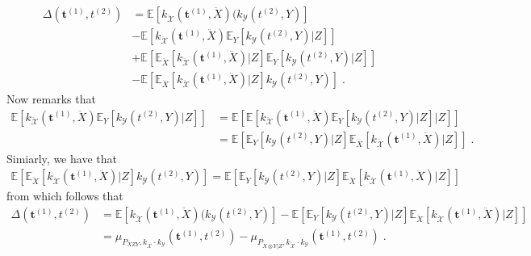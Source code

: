 \begin{align*}
    \Delta(\mathbf{t}^{(1)},t^{(2)}) &=\mathbb{E}\left[k_{\mathcal{\ddot{X}}}(\mathbf{t}^{(1)},\ddot{X})(k_{\mathcal{Y}}(t^{(2)},Y)\right]\\ 
    &- \mathbb{E}\left[k_{\mathcal{\ddot{X}}}(\mathbf{t}^{(1)},\ddot{X})\mathbb{E}_{Y}\left[k_{\mathcal{Y}}(t^{(2)},Y)|Z\right]\right]\\
    &+ \mathbb{E}\left[\mathbb{E}_{\ddot{X}}\left[k_{\mathcal{\ddot{X}}}(\mathbf{t}^{(1)},\ddot{X})|Z\right] \mathbb{E}_{Y}\left[k_{\mathcal{Y}}(t^{(2)},Y)|Z\right] \right]\\
   &- \mathbb{E}\left[\mathbb{E}_{\ddot{X}}\left[k_{\mathcal{\ddot{X}}}(\mathbf{t}^{(1)},\ddot{X})|Z\right]k_{\mathcal{Y}}(t^{(2)},Y)\right]\;.
\end{align*}
Now remarks that
\begin{align*}
    \mathbb{E}\left[k_{\mathcal{\ddot{X}}}(\mathbf{t}^{(1)},\ddot{X})\mathbb{E}_{Y}\left[k_{\mathcal{Y}}(t^{(2)},Y)|Z\right]\right] &= \mathbb{E}\left[\mathbb{E}\left[k_{\mathcal{\ddot{X}}}(\mathbf{t}^{(1)},\ddot{X})\mathbb{E}_{Y}\left[k_{\mathcal{Y}}(t^{(2)},Y)|Z\right]\big|Z\right]\right]\\
    &=\mathbb{E}\left[\mathbb{E}_{Y}\left[k_{\mathcal{Y}}(t^{(2)},Y)|Z\right]  \mathbb{E}_{\ddot{X}}\left[k_{\mathcal{\ddot{X}}}(\mathbf{t}^{(1)},\ddot{X})|Z\right]\right]\;.
\end{align*}
Simiarly, we have that 
\begin{align*}
\mathbb{E}\left[\mathbb{E}_{\ddot{X}}\left[k_{\mathcal{\ddot{X}}}(\mathbf{t}^{(1)},\ddot{X})|Z\right]k_{\mathcal{Y}}(t^{(2)},Y)\right] = \mathbb{E}\left[\mathbb{E}_{Y}\left[k_{\mathcal{Y}}(t^{(2)},Y)|Z\right]  \mathbb{E}_{\ddot{X}}\left[k_{\mathcal{\ddot{X}}}(\mathbf{t}^{(1)},\ddot{X})|Z\right]\right]
\end{align*}
from which follows that 
\begin{align*}
    \Delta(\mathbf{t}^{(1)},t^{(2)}) & = \mathbb{E}\left[k_{\mathcal{\ddot{X}}}(\mathbf{t}^{(1)},\ddot{X})(k_{\mathcal{Y}}(t^{(2)},Y)\right] - \mathbb{E}\left[\mathbb{E}_{Y}\left[k_{\mathcal{Y}}(t^{(2)},Y)|Z\right]  \mathbb{E}_{\ddot{X}}\left[k_{\mathcal{\ddot{X}}}(\mathbf{t}^{(1)},\ddot{X})|Z\right]\right]\\
    &=  \mu_{P_{XZY},k_{\mathcal{\ddot{X}}}\cdot k_{\mathcal{Y}}}(\mathbf{t}^{(1)},t^{(2)}) - \mu_{P_{\ddot{X}\otimes Y|Z},k_{\mathcal{\ddot{X}}}\cdot k_{\mathcal{Y}}}(\mathbf{t}^{(1)},t^{(2)})\;.
\end{align*}


